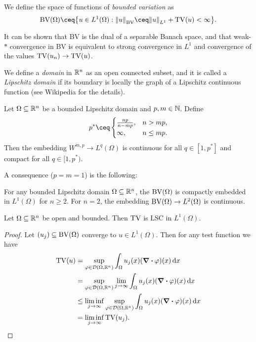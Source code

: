 \begin{definition}
	We define the space of functions of \emph{bounded variation} as
	\[
	\BV(\Omega) \ceq \qty{u \in L^1(\Omega) : \norm{u}_{\BV} \ceq \norm{u}_{L^1} + \TV(u) < \infty}.
	\]
\end{definition}
\begin{remark}
	It can be shown that BV is the dual of a separable Banach space, and that weak-$*$ convergence in BV is equivalent to strong convergence in $L^1$ and convergence of the values $\operatorname{TV}(u_n) \to \operatorname{TV}(u)$. 
\end{remark}

\begin{definition}
	We define a \emph{domain} in $\mathbb R^n$ as an open connected subset, and it is called a \emph{Lipschitz domain} if its boundary is locally the graph of a Lipschitz continuous function (see Wikipedia for the details). 
\end{definition}

\begin{theorem}
	Let $\Omega \subseteq \mathbb R^n$ be a bounded Lipschitz domain and $p, m \in \mathbb N$. Define 
	\[
	p^* \ceq \begin{cases} \frac{np}{n - mp}, &n > mp, \\ \infty,& n \leq mp. \end{cases}
	\]
	Then the embedding $W^{m, p} \to L^q(\Omega)$ is continuous for all $q \in [1, p^*]$ and compact for all $q \in [1, p^*)$. 
\end{theorem}

A consequence ($p = m = 1$) is the following:
\begin{corollary}
	For any bounded Lipschitz domain $\Omega \subseteq \mathbb R^n$, the $\operatorname{BV}(\Omega)$ is compactly embedded in $L^1(\Omega)$ for $n \geq 2$. For $n = 2$, the embedding $\operatorname{BV}(\Omega) \to L^2(\Omega)$ is continuous. 
\end{corollary}

\begin{theorem}
	Let $\Omega \subseteq \mathbb R^n$ be open and bounded. Then $\operatorname{TV}$ is LSC in $L^1(\Omega)$. 
\end{theorem}

\begin{proof}
	Let $(u_j) \subseteq \operatorname{BV}(\Omega)$ converge to $u \in L^1(\Omega)$. Then for any test function we have
	\begin{align*}
		\operatorname{TV}(u) &= \sup_{\varphi \in \mathcal D(\Omega, \mathbb R^n)}\int_\Omega u_j(x) (\div \varphi)(x) \dd{x} \\
		&= \sup_{\varphi \in \mathcal D(\Omega, \mathbb R^n)} \lim_{j\to\infty} \int_\Omega u_j(x) (\div \varphi)(x) \dd{x} \\
		&\leq \liminf_{j\to\infty} \sup_{\varphi \in \mathcal D(\Omega, \mathbb R^n)} \int_\Omega u_j(x) (\div\varphi)(x) \dd{x} \\
		&= \liminf_{j\to\infty} \operatorname{TV}(u_j). 
	\end{align*}
\end{proof}